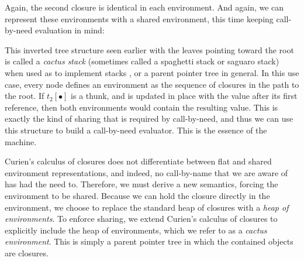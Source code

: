 Again, the second closure is identical in each environment.  And again,
we can represent these environments with a shared environment, this time
keeping call-by-need evaluation in mind:
\begin{center}
\end{center}
This inverted tree structure seen earlier with the leaves pointing toward the
root is called a \emph{cactus stack} (sometimes called a spaghetti stack or
saguaro stack) when used as to implement stacks
\cite{hauck1968burroughs,ichbiah1991rationale}, or a parent pointer tree in
general. In this use case, every node defines an environment as the sequence of
closures in the path to the root.  If $t_2[\bullet]$ is a thunk, and is updated
in place with the value after its first reference, then both environments would
contain the resulting value. This is exactly the kind of sharing that is
required by call-by-need, and thus we can use this structure to build a
call-by-need evaluator. This is the essence of the \ce machine. 

Curien's calculus of closures does not differentiate between flat and shared
environment representations, and indeed, no call-by-name that we are aware of
has had the need to. Therefore, we must derive a new semantics, forcing the
environment to be shared. Because we can hold the closure directly in the
environment, we choose to replace the standard heap of closures with a
\emph{heap of environments}. To enforce sharing, we extend Curien's calculus of
closures to explicitly include the heap of environments, which we refer to as a
\emph{cactus environment}. This is simply a parent pointer tree in which the
contained objects are closures. 

